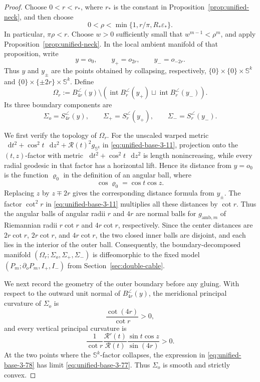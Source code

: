 \documentclass[11pt,reqno]{amsart}
\theoremstyle{definition}
\numberwithin{equation}{section}
\newcommand{\dd}{\mathop{}\!\mathrm d}
\begin{document}
\begin{proof}
Choose $0<r<r_*$, where $r_*$ is the constant in
Proposition~\ref{prop:unified-neck}, and then choose
\begin{equation}
0<\rho<\min\{1,r/\pi,R_*\varepsilon_*\}.            \label{eq:unified-base-3-75}
\end{equation}
In particular, $\pi\rho<r$.  Choose $w>0$ sufficiently small that
$w^{m-1}<\rho^m$, and apply Proposition~\ref{prop:unified-neck}.
In the local ambient manifold of that proposition, write
\[
 y=o_0,\qquad y_+=o_{2r},\qquad y_-=o_{-2r}.
\]
Thus $y$ and $y_\pm$ are the points obtained by collapsing, respectively,
$\{0\}\times\{0\}\times\mathbb S^k$ and
$\{0\}\times\{\pm2r\}\times\mathbb S^k$.  Define
\[
 \Omega_r:=B_{4r}^{\angle}(y)\setminus
   \left(\operatorname{int}B_r^{\angle}(y_+)
          \sqcup\operatorname{int}B_r^{\angle}(y_-)\right).
\]
Its three boundary components are
\[
 \Sigma_o=S_{4r}^{\angle}(y),\qquad
 \Sigma_+=S_r^{\angle}(y_+),\qquad
 \Sigma_-=S_r^{\angle}(y_-).
\]

We first verify the topology of $\Omega_r$.  For the unscaled warped
metric $ \dd t^2+\cos^2t\,\dd z^2+\mathcal R(t)^2g_{\mathbb S^k}$ in \eqref{eq:unified-base-3-11},
projection onto the $(t,z)$-factor with metric
$\dd t^2+\cos^2t\,\dd z^2$ is length nonincreasing, while every radial
geodesic in that factor has a horizontal lift.  Hence its distance from
$y=o_0$ is the function $\varrho_0$ in the definition of an angular
ball, where
\begin{equation}
\cos\varrho_0=\cos t\cos z.              \label{eq:unified-base-3-76}
\end{equation}
Replacing $z$ by $z\mp2r$ gives the corresponding distance formula
from $y_\pm$.  The factor $\cot^2r$ in
\eqref{eq:unified-base-3-11} multiplies all these distances by
$\cot r$.  Thus the angular balls of angular radii $r$ and $4r$ are
normal balls for $g_{\mathrm{amb},m}$ of Riemannian radii
$r\cot r$ and $4r\cot r$, respectively.  Since the center distances
are $2r\cot r$, $2r\cot r$, and $4r\cot r$, the two closed inner
balls are disjoint, and each lies in the interior of the outer ball.
Consequently, the boundary-decomposed manifold
$(\Omega_r;\Sigma_o,\Sigma_+,\Sigma_-)$ is diffeomorphic to the fixed
model $(P_m;\partial_oP_m,I_+,I_-)$ from
Section~\ref{sec:double-cable}.

We next record the geometry of the outer boundary before any gluing.
With respect to the outward unit normal of $B_{4r}^{\angle}(y)$, the
meridional principal curvature of $\Sigma_o$ is
\begin{equation}
\frac{\cot(4r)}{\cot r}>0,                \label{eq:unified-base-3-77}
\end{equation}
and every vertical principal curvature is
\begin{equation}
\frac1{\cot r}\frac{\mathcal R'(t)}{\mathcal R(t)}
       \frac{\sin t\cos z}{\sin(4r)}>0.                           \label{eq:unified-base-3-78}
\end{equation}
At the two points where the $\mathbb S^k$-factor collapses, the
expression in \eqref{eq:unified-base-3-78} has limit
\eqref{eq:unified-base-3-77}.  Thus $\Sigma_o$ is smooth and strictly
convex.


\end{proof}
\end{document}
